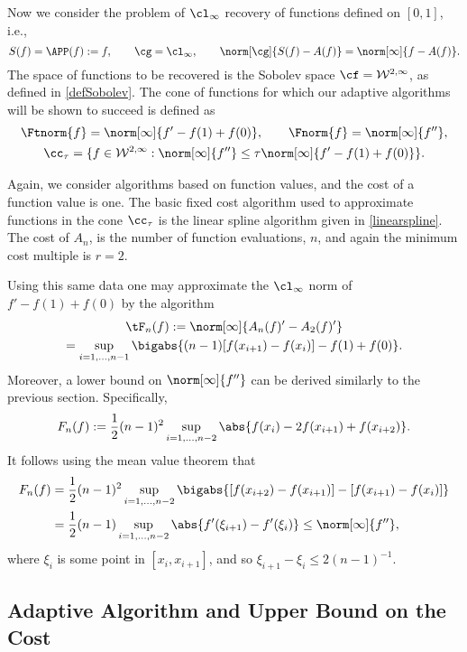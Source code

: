 Now we consider the problem of $\cl_{\infty}$ recovery of functions defined on $[0,1]$, i.e.,
\[
S(f)=\APP(f):=f, \qquad \cg=\cl_{\infty}, \qquad \norm[\cg]{S(f)-A(f)}=\norm[\infty]{f-A(f)}.
\]
The space of functions to be recovered is the Sobolev space $\cf = \mathcal{W}^{2,\infty}$, as defined in \eqref{defSobolev}.  The cone of functions for which our adaptive algorithms will be shown to succeed is defined as
\begin{subequations} \label{coneappxdef}
\begin{gather}
\Ftnorm{f}=\norm[\infty]{f'-f(1)+f(0)}, \qquad \Fnorm{f}=\norm[\infty]{f''}, \\
\cc_{\tau}=\{f \in  \mathcal{W}^{2,\infty} : \norm[\infty]{f''}\leq \tau\norm[\infty]{f'-f(1)+f(0)}\}.
\end{gather}
\end{subequations}

Again, we consider algorithms based on function values, and the cost of a function value is one.   The basic fixed cost algorithm used to approximate functions in the cone $\cc_{\tau}$ is the linear spline algorithm given in \eqref{linearspline}.  
The cost of $A_n$, is the number of function evaluations, $n$, and again the minimum cost multiple is $r=2$.

Using this same data one may approximate the $\cl_\infty$ norm of $f'-f(1)+f(0)$ by the algorithm
\begin{multline}\label{estfirstderiv}
\tF_n(f) := \norm[\infty]{A_n(f)' - A_2(f)'} \\
= \sup_{i=1, \ldots, n-1} \bigabs{(n-1) [f(x_{i+1})-f(x_i)]-f(1)+f(0)}.
\end{multline}
Moreover, a lower bound on $\norm[\infty]{f''}$ can be derived similarly to the previous section.  Specifically,
\begin{equation} \label{Fnormappxalg}
F_n(f) := \frac 1 2 (n-1)^2\sup_{i=1, \ldots, n-2} \abs{f(x_i) - 2 f(x_{i+1})+f(x_{i+2})}.
\end{equation}
It follows using the mean value theorem that 
\begin{align*}
F_n(f) &= \frac 1 2 (n-1)^2\sup_{i=1, \ldots, n-2} \bigabs{[f(x_{i+2}) - f(x_{i+1})] - [f(x_{i+1}) - f(x_{i})]} \\
&= \frac 1 2 (n-1)\sup_{i=1, \ldots, n-2} \abs{f'(\xi_{i+1}) - f'(\xi_{i})} \le \norm[\infty]{f''},
\end{align*}
where $\xi_i$ is some point in $[x_i,x_{i+1}]$, and so $\xi_{i+1} - \xi_i \le 2(n-1)^{-1}$.

\subsection{Adaptive Algorithm and Upper Bound on the Cost}

